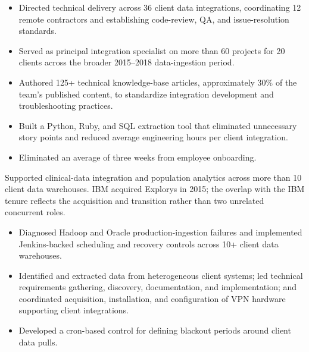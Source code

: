 \begin{itemize}
  \item Directed technical delivery across 36 client data integrations, coordinating 12 remote contractors and establishing code-review, QA, and issue-resolution standards.
  \item Served as principal integration specialist on more than 60 projects for 20 clients across the broader 2015--2018 data-ingestion period.
  \item Authored 125+ technical knowledge-base articles, approximately 30\% of the team's published content, to standardize integration development and troubleshooting practices.
  \item Built a Python, Ruby, and SQL extraction tool that eliminated unnecessary story points and reduced average engineering hours per client integration.
  \item Eliminated an average of three weeks from employee onboarding.
\end{itemize}

Supported clinical-data integration and population analytics across more than 10 client data warehouses. IBM acquired Explorys in 2015; the overlap with the IBM tenure reflects the acquisition and transition rather than two unrelated concurrent roles.
\begin{itemize}
  \item Diagnosed Hadoop and Oracle production-ingestion failures and implemented Jenkins-backed scheduling and recovery controls across 10+ client data warehouses.
  \item Identified and extracted data from heterogeneous client systems; led technical requirements gathering, discovery, documentation, and implementation; and coordinated acquisition, installation, and configuration of VPN hardware supporting client integrations.
  \item Developed a cron-based control for defining blackout periods around client data pulls.
\end{itemize}


